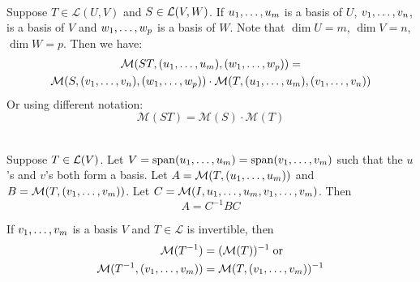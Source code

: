   \begin{thm}
     \\
    Suppose $T\in \mathcal{L}(U,V)$ and $S\in {\mathcal{L}(V,W)}$. If $u_1, \dots, u_m$ is a basis of $U$, $v_1, \dots, v_n$, is a basis of $V$ and $w_1, \dots, w_{p}$ is a basis of $W$. Note that $\dim U = m$, $\dim V = n$, $\dim W = p$. Then we have:
    \begin{equation}
    \begin{gathered}
      \mathcal{M}(ST, (u_1, \dots, u_m), (w_1, \dots, w_{p})) = \\
      \mathcal{M}(S, (v_1, \dots, v_n), (w_1, \dots, w_{p} ))
      \cdot
      \mathcal{M}(T, (u_1, \dots, u_m), (v_1, \dots, v_n   ))
    \end{gathered}
    \end{equation}
    Or using different notation:
    \begin{equation}
      \mathcal{M}(ST) = \mathcal{M}(S) \cdot \mathcal{M}(T)
    \end{equation}
  \end{thm}

  \setcounter{thm}{83}
  \begin{thm}
    \\
    Suppose $T \in \mathcal{L}(V)$. Let
    $V = \operatorname{span} (u_1, \dots, u_m) = \operatorname{span} (v_1, \dots, v_m)$ such that the $u$'s and $v$'s both form a basis. Let $A=\mathcal{M}(T, (u_1, \dots, u_m))$ and $B=\mathcal{M}(T,(v_1, \dots, v_m))$. Let
    $C=\mathcal{M}(I, u_1, \dots, u_m, v_1, \dots, v_m)$. Then
    \begin {equation}
    A = C^{-1} B C
    \end {equation}
  \end{thm}

  \setcounter{thm}{85}
  \begin{thm}
    If $v_1, \dots, v_m$ is a basis $V$ and $T\in \mathcal{L}$ is invertible, then
    \begin{equation}
      \begin{aligned}
        \mathcal{M}(T^{-1}) & = (\mathcal{M}(T))^{-1} \; \text{or} \\
        \mathcal{M}(T^{-1}, (v_1, \dots, v_m)) & =\mathcal{M}(T, (v_1, \dots, v_m))^{-1}
      \end{aligned}
    \end{equation}
  \end{thm}
